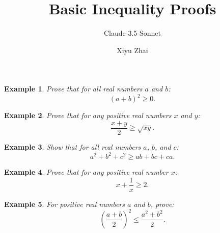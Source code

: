 \documentclass{article}
\newtheorem{example}{Example}
\begin{document}
\title{Basic Inequality Proofs}
\author{Claude-3.5-Sonnet \and Xiyu Zhai}
\maketitle

\begin{example}
    Prove that for all real numbers $a$ and $b$:
    $$(a+b)^2 \geq 0.$$
\end{example}

\begin{example}
    Prove that for any positive real numbers $x$ and $y$:
    $$\frac{x+y}{2} \geq \sqrt{xy}.$$
\end{example}

\begin{example}
    Show that for all real numbers $a$, $b$, and $c$:
    $$a^2 + b^2 + c^2 \geq ab + bc + ca.$$
\end{example}

\begin{example}
    Prove that for any positive real number $x$:
    $$x + \frac{1}{x} \geq 2.$$
\end{example}

\begin{example}
    For positive real numbers $a$ and $b$, prove:
    $$\left(\frac{a+b}{2}\right)^2 \leq \frac{a^2+b^2}{2}.$$
\end{example}
\end{document}
